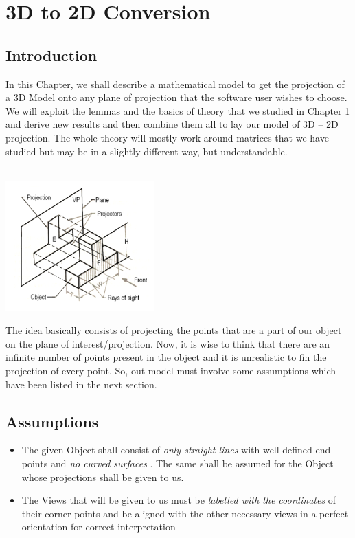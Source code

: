 \documentclass[12pt]{report}
\begin{document}
\chapter{3D to 2D Conversion}

\section{Introduction}

In this Chapter, we shall describe a mathematical model to get the projection of a 3D Model onto any plane of projection that the software user wishes to choose. We will exploit the lemmas and the basics of theory that we studied in Chapter 1 and derive new results and then combine them all to lay our model of 3D – 2D projection. The whole theory will mostly work around matrices that we have studied but may be in a slightly different way, but understandable. \\
\\


\begin{center}
  \includegraphics[height=5cm]{3to2intro.PNG}
\end{center}

\hspace{1cm} The idea basically consists of projecting the points that are a part of our object on the plane of interest/projection. Now, it is wise to think that there are an infinite number of points present in the object and it is unrealistic to fin the projection of every point. So, out model must involve some assumptions which have been listed in the next section.\\



\section{Assumptions}

\begin{itemize}%
    \item 
  The given Object shall consist of \textit{ only straight lines } with well defined end points and \textit{ no curved surfaces } . The same shall be assumed for the Object whose projections shall be given to us.
    \item 
  The Views that will be given to us must be \textit{ labelled with the coordinates } of their corner points and be aligned with the other necessary views in a perfect orientation for correct interpretation
\end{itemize}
\end{document}
